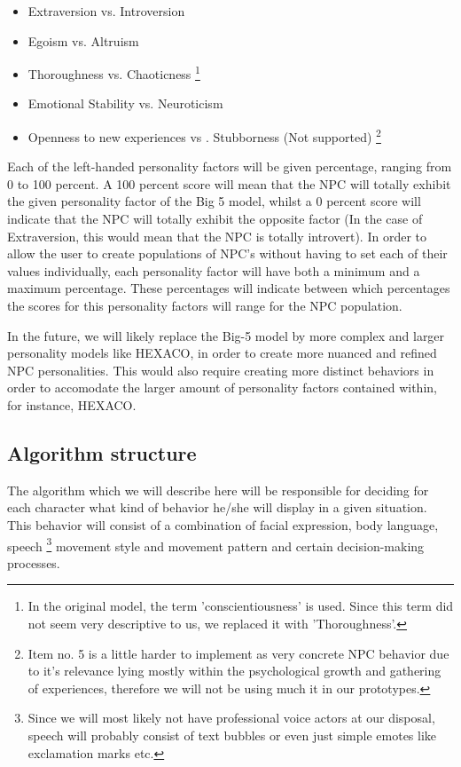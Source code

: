 \documentclass{article}
\begin{document}
   \begin{itemize}
   	\item Extraversion vs. Introversion
   	\item Egoism vs. Altruism
   	\item Thoroughness vs. Chaoticness \footnote{In the original model, the term 'conscientiousness' is used. Since this term did not seem very descriptive to us, we replaced it with 'Thoroughness'.}
   	\item Emotional Stability vs. Neuroticism 
   	\item Openness to new experiences vs . Stubborness (Not supported) \footnote{Item no. 5 is a little harder to implement as very concrete NPC behavior due to it's relevance lying mostly within the psychological growth and gathering of experiences, therefore we will not be using much it in our prototypes.}
   \end{itemize}

    Each of the left-handed personality factors will be given percentage, ranging from 0 to 100 percent. A 100 percent score will mean that the NPC will totally exhibit the given personality 	   factor of the Big 5 model, whilst a 0 percent score will indicate that the NPC will totally exhibit the opposite factor (In the case of Extraversion, this would mean that the NPC is totally                   introvert). In order to allow the user to create populations of NPC's without having to set each of their values individually, each personality factor will have both a minimum and a maximum  percentage. These percentages will indicate between which percentages the scores for this personality factors will range for the NPC population. 

  In the future, we will likely replace the Big-5 model by more complex and larger personality models like HEXACO, in order to create more nuanced and refined NPC personalities. This would also require creating more distinct behaviors in order to accomodate the larger amount of personality factors contained within, for instance, HEXACO.

   \newpage
   \subsection{Algorithm structure}
    The algorithm which we will describe here will be responsible for deciding for each character what kind of behavior he/she will display in a given situation. This behavior will consist of a combination of facial expression, body language, speech \footnote{Since we will most likely not have professional voice actors at our disposal, speech will probably consist of text bubbles or even just simple emotes like exclamation marks etc.} movement style and movement pattern and certain decision-making processes. 
\end{document}
